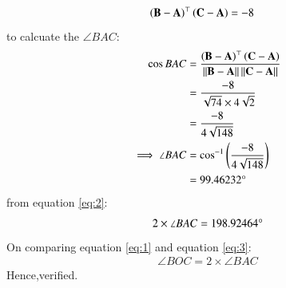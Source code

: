 \documentclass[journal,12pt,twocolumn]{IEEEtran}
\theoremstyle{remark}
\begin{document}
\begin{enumerate}
\begin{align}
\left(\mathbf{B}-\mathbf{A}\right)^{\top}\left(\mathbf{C}-\mathbf{A}\right)&=-8
\end{align}
to calcuate the $\angle{BAC}$:
\begin{align}
\cos{BAC}&=\frac{\brak{\vec{B}-\vec{A}}^{\top}\brak{\vec{C}-\vec{A}}}{\norm{\vec{B}-\vec{A}}\norm{\vec{C}-\vec{A}}}\\
&=\frac{-8}{\sqrt{74}\times4\sqrt{2}}\\
&=\frac{-8}{4\sqrt{148}}\\
\implies\angle{BAC}&=\cos^{-1}\brak{\frac{-8}{4\sqrt{148}}}\\
&=99.46232\degree \label{eq:2}
\end{align}
from equation \eqref{eq:2}:
\begin{align}
2\times\angle{BAC}=198.92464\degree \label{eq:3}
\end{align}
On comparing equation \eqref{eq:1} and equation \eqref{eq:3}:
\begin{align}
\angle{BOC}=2\times\angle{BAC}
\end{align}
Hence,verified.

\end{enumerate}
\end{document}
